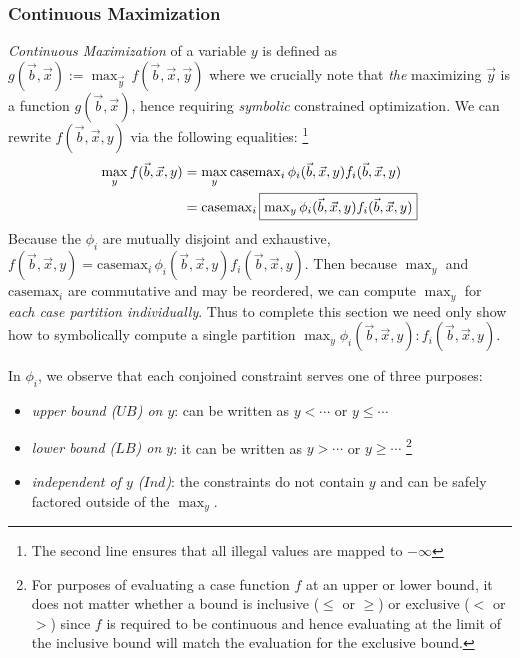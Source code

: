 \documentclass[twoside,11pt]{article}
\newcommand{\casemax}{\mathrm{casemax}}
\newcommand{\UB}{\mathit{UB}}
\newcommand{\LB}{\mathit{LB}}
\newcommand{\IND}{\mathit{Ind}}
\begin{document}
\subsubsection*{Continuous Maximization}
\emph{Continuous Maximization} of a variable $y$ is defined as $g(\vec{b},\vec{x}) := \max_{\vec{y}}
\, f(\vec{b},\vec{x},\vec{y})$ where we crucially note that 
\emph{the} maximizing $\vec{y}$ is a function
$g(\vec{b},\vec{x})$, hence requiring \emph{symbolic} 
constrained optimization. We can rewrite $f(\vec{b},\vec{x},y)$ via 
the following equalities:
\footnote{The second line ensures that all illegal values are mapped to $-\infty$}
{%
\begin{align}
\max_y f(\vec{b},\vec{x},y) & = 
\max_y \casemax_i \, \phi_i(\vec{b},\vec{x},y) f_i(\vec{b},\vec{x},y) \nonumber \\
& = \casemax_i \, \fbox{$\max_y \phi_i(\vec{b},\vec{x},y) f_i(\vec{b},\vec{x},y)$} \label{eq:casemax_max}
\end{align}
}
Because the 
$\phi_i$ are mutually disjoint and exhaustive, 
$f(\vec{b},\vec{x},y) = \casemax_i \, \phi_i(\vec{b},\vec{x},y) f_i(\vec{b},\vec{x},y)$.  
Then because 
$\max_y$ and $\casemax_i$ are commutative and may be reordered,
we can compute $\max_y$ for \emph{each case partition
individually}.  Thus to complete this section we need only
show how to symbolically compute a single partition 
$\max_y \phi_i(\vec{b},\vec{x},y): f_i(\vec{b},\vec{x},y)$.

In $\phi_i$, we observe that each conjoined constraint serves one of
three purposes: 
\begin{itemize}
\item \emph{upper bound ($\UB$) on $y$}: can be written as $y < \cdots$ or $y \leq \cdots$
\item \emph{lower bound ($\LB$) on $y$}: it can be written as $y >\cdots$ or $y \geq \cdots$
\footnote{For purposes of evaluating
a case function $f$ at an upper or lower bound,
it does not matter whether a bound is inclusive ($\leq$ or $\geq$)
or exclusive ($<$ or $>$) since $f$ is required to be continuous
and hence evaluating at the limit of the inclusive bound will
match the evaluation for the exclusive bound.}
\item \emph{independent of $y$ ($\IND$)}: the constraints do not contain $y$
and can be safely factored outside of the $\max_y$.
\end{itemize}
\end{document}

